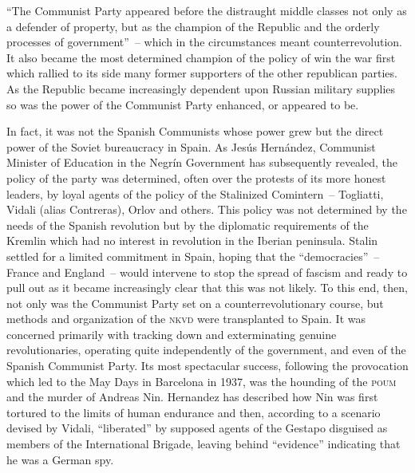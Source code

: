 ``The Communist Party appeared before the distraught middle classes not only as a defender of property, but as the champion of the Republic and the orderly processes of government''~-- which in the circumstances meant counterrevolution. It also became the most determined champion of the policy of win the war first which rallied to its side many former supporters of the other republican parties. As the Republic became increasingly dependent upon Russian military supplies so was the power of the Communist Party enhanced, or appeared to be.

In fact, it was not the Spanish Communists whose power grew but the direct power of the Soviet bureaucracy in Spain. As Jes\'us Hern\'andez, Communist Minister of Education in the Negr\'in Government has subsequently revealed, the policy of the party was determined, often over the protests of its more honest leaders, by loyal agents of the policy of the Stalinized Comintern~-- Togliatti, Vidali{\indexVVidali} (alias Contreras), Orlov and others. This policy was not determined by the needs of the Spanish revolution but by the diplomatic requirements of the Kremlin which had no interest in revolution in the Iberian peninsula. Stalin settled for a limited commitment in Spain, hoping that the ``democracies''~-- France and England~-- would intervene to stop the spread of fascism and ready to pull out as it became increasingly clear that this was not likely. To this end, then, not only was the Communist Party set on a counterrevolutionary course, but methods and organization of the \textsc{nkvd} were transplanted to Spain. It was concerned primarily with tracking down and exterminating genuine revolutionaries, operating quite independently of the government, and even of the Spanish Communist Party. Its most spectacular success, following the provocation which led to the May Days in Barcelona in 1937, was the hounding of the \textsc{poum} and the murder of Andreas Nin.{\indexANin} Hernandez has described how Nin was first tortured to the limits of human endurance and then, according to a scenario devised by Vidali, ``liberated'' by supposed agents of the Gestapo disguised as members of the International Brigade, leaving behind ``evidence'' indicating that he was a German spy.

